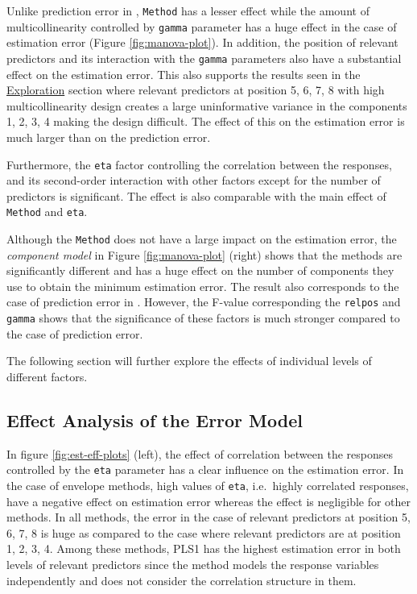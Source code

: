 \documentclass[12pt,3p,authoryear]{elsarticle}
\providecommand{\tightlist}{%
  \setlength{\itemsep}{0pt}\setlength{\parskip}{0pt}}
\begin{document}
\begin{description}
\tightlist
\item[\textbf{Error Model:}]
Unlike prediction error in \citet{rimal2019pred}, \texttt{Method} has a lesser effect while the amount of multicollinearity controlled by \texttt{gamma} parameter has a huge effect in the case of estimation error (Figure \ref{fig:manova-plot}). In addition, the position of relevant predictors and its interaction with the \texttt{gamma} parameters also have a substantial effect on the estimation error. This also supports the results seen in the \protect\hyperlink{exploration}{Exploration} section where relevant predictors at position 5, 6, 7, 8 with high multicollinearity design creates a large uninformative variance in the components 1, 2, 3, 4 making the design difficult. The effect of this on the estimation error is much larger than on the prediction error.

Furthermore, the \texttt{eta} factor controlling the correlation between the responses, and its second-order interaction with other factors except for the number of predictors is significant. The effect is also comparable with the main effect of \texttt{Method} and \texttt{eta}.
\item[\textbf{Component Model:}]
Although the \texttt{Method} does not have a large impact on the estimation error, the \emph{component model} in Figure \ref{fig:manova-plot} (right) shows that the methods are significantly different and has a huge effect on the number of components they use to obtain the minimum estimation error. The result also corresponds to the case of prediction error in \citet{rimal2019pred}. However, the F-value corresponding the \texttt{relpos} and \texttt{gamma} shows that the significance of these factors is much stronger compared to the case of prediction error.
\end{description}

The following section will further explore the effects of individual levels of different factors.

\hypertarget{effect-analysis-of-the-error-model}{%
\subsection{Effect Analysis of the Error Model}\label{effect-analysis-of-the-error-model}}

In figure \ref{fig:est-eff-plots} (left), the effect of correlation between the responses controlled by the \texttt{eta} parameter has a clear influence on the estimation error. In the case of envelope methods, high values of \texttt{eta}, i.e.~highly correlated responses, have a negative effect on estimation error whereas the effect is negligible for other methods. In all methods, the error in the case of relevant predictors at position 5, 6, 7, 8 is huge as compared to the case where relevant predictors are at position 1, 2, 3, 4. Among these methods, PLS1 has the highest estimation error in both levels of relevant predictors since the method models the response variables independently and does not consider the correlation structure in them.
\end{document}
